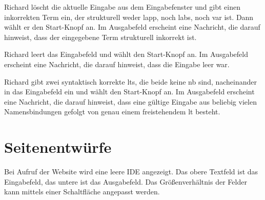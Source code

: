 \documentclass[parskip=full,11pt,twoside]{scrartcl}
\begin{document}
{
{Richard löscht die aktuelle Eingabe aus dem Eingabefenster und gibt einen inkorrekten Term ein, der strukturell weder \gls{lapp}, noch
\gls{labs}, noch \gls{var} ist. Dann wählt er den Start-Knopf an.}
{Im Ausgabefeld erscheint eine Nachricht, die darauf hinweist, dass der eingegebene
Term strukturell inkorrekt ist.}

{Richard leert das Eingabefeld und wählt den Start-Knopf an.}
{Im Ausgabefeld erscheint eine Nachricht, die darauf hinweist, dass die Eingabe leer war.}

{Richard gibt zwei syntaktisch korrekte \glspl{lt}, die beide keine \gls{nb} sind, nacheinander
in das Eingabefeld ein und wählt den Start-Knopf an.}
{Im Ausgabefeld erscheint eine Nachricht, die darauf hinweist, dass eine gültige Eingabe
aus beliebig vielen Namensbindungen gefolgt von genau einem freistehendem \gls{lt} besteht.}
%
%
%

\pagebreak
\appendix

\section{Seitenentwürfe}


Bei Aufruf der Website wird eine leere IDE angezeigt. Das obere Textfeld ist das Eingabefeld, das untere ist das Ausgabefeld. Das Größenverhältnis der Felder kann mittels einer Schaltfläche angepasst werden.

}
\end{document}
